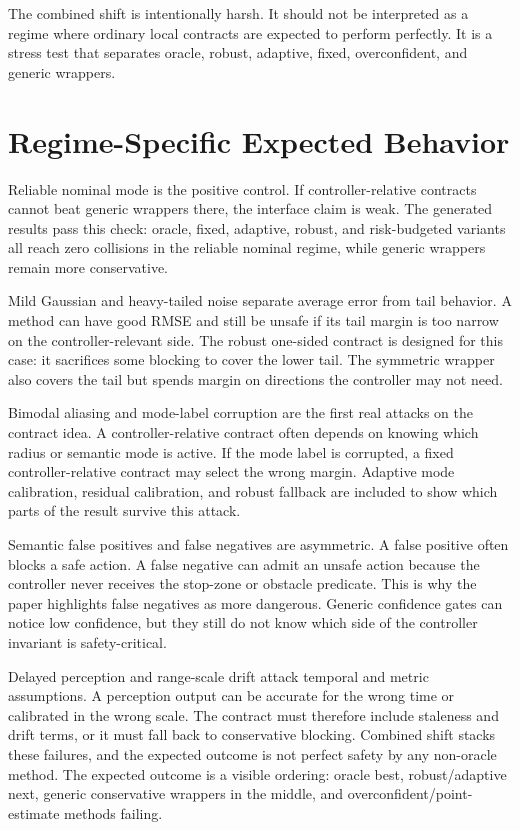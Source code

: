 \documentclass{article}
\begin{document}
The combined shift is intentionally harsh. It should not be interpreted as a regime where ordinary local contracts are expected to perform perfectly. It is a stress test that separates oracle, robust, adaptive, fixed, overconfident, and generic wrappers.

\section{Regime-Specific Expected Behavior}

Reliable nominal mode is the positive control. If controller-relative contracts cannot beat generic wrappers there, the interface claim is weak. The generated results pass this check: oracle, fixed, adaptive, robust, and risk-budgeted variants all reach zero collisions in the reliable nominal regime, while generic wrappers remain more conservative.

Mild Gaussian and heavy-tailed noise separate average error from tail behavior. A method can have good RMSE and still be unsafe if its tail margin is too narrow on the controller-relevant side. The robust one-sided contract is designed for this case: it sacrifices some blocking to cover the lower tail. The symmetric wrapper also covers the tail but spends margin on directions the controller may not need.

Bimodal aliasing and mode-label corruption are the first real attacks on the contract idea. A controller-relative contract often depends on knowing which radius or semantic mode is active. If the mode label is corrupted, a fixed controller-relative contract may select the wrong margin. Adaptive mode calibration, residual calibration, and robust fallback are included to show which parts of the result survive this attack.

Semantic false positives and false negatives are asymmetric. A false positive often blocks a safe action. A false negative can admit an unsafe action because the controller never receives the stop-zone or obstacle predicate. This is why the paper highlights false negatives as more dangerous. Generic confidence gates can notice low confidence, but they still do not know which side of the controller invariant is safety-critical.

Delayed perception and range-scale drift attack temporal and metric assumptions. A perception output can be accurate for the wrong time or calibrated in the wrong scale. The contract must therefore include staleness and drift terms, or it must fall back to conservative blocking. Combined shift stacks these failures, and the expected outcome is not perfect safety by any non-oracle method. The expected outcome is a visible ordering: oracle best, robust/adaptive next, generic conservative wrappers in the middle, and overconfident/point-estimate methods failing.
\end{document}
